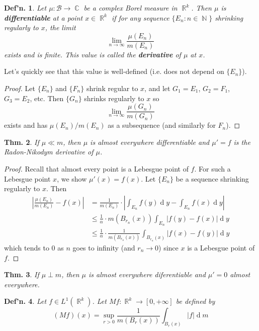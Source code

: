 \documentclass[12pt, a4paper]{book}
\DeclareMathOperator{\N}{\mathbb{N}}
\DeclareMathOperator{\R}{\mathbb{R}}
\DeclareMathOperator{\C}{\mathbb{C}}
\renewcommand{\d}[1]{\ensuremath{\operatorname{d}\!{#1}}} %
\newtheorem{theorem}{Thm.}[section]
\newtheorem{definition}[theorem]{Def'n.}
\theoremstyle{nonumberplain}
\newtheorem{proof}{Proof}
\begin{document}
\begin{definition}
    Let $\mu:\mathcal{B}\to\C$ be a complex Borel measure in $\R^k$.
    Then $\mu$ is \textbf{differentiable} at a point $x\in\R^k$ if for any sequence $\{E_n:n\in\N\}$ shrinking regularly to $x$, the limit
    \[\lim_{n\to\infty}\frac{\mu(E_n)}{m(E_n)}\]
    exists and is finite.
    This value is called the \textbf{derivative} of $\mu$ at $x$.
\end{definition}
Let's quickly see that this value is well-defined (i.e. does not depend on $\{E_n\}$).
\begin{proof}
    Let $\{E_n\}$ and $\{F_n\}$ shrink regular to $x$, and let $G_1=E_1$, $G_2=F_1$, $G_3=E_2$, etc.
    Then $\{G_n\}$ shrinks regularly to $x$ so
    \[\lim_{n\to\infty}\frac{\mu(G_n)}{m(G_n)}\]
    exists and has $\mu(E_n)/m(E_n)$ as a subsequence (and similarly for $F_n$).
\end{proof}
\begin{theorem}
    If $\mu\ll m$, then $\mu$ is almost everywhere differentiable and $\mu'=f$ is the Radon-Nikodym derivative of $\mu$.
\end{theorem}
\begin{proof}
    Recall that almost every point is a Lebesgue point of $f$.
    For such a Lebesgue point $x$, we show $\mu'(x)=f(x)$.
    Let $\{E_n\}$ be a sequence shrinking regularly to $x$.
    Then
    \begin{align*}
        \left\lvert\frac{\mu(E_n)}{m(E_n)}-f(x)\right\rvert &= \frac{1}{m(E_n)}\cdot\left\lvert\int_{E_n}f(y)\d{y}-\int_{E_n}f(x)\d{y}\right\rvert\\
                                                            &\leq \frac{1}{\alpha}\cdot m(B_{r_n}(x))\int_{E_n}|f(y)-f(x)|\d{y}\\
                                                            &\leq\frac{1}{\alpha}\cdot\frac{1}{m(B_{r_n}(x))}\int_{B_{r_n}(x)}|f(x)-f(y)|\d{y}
    \end{align*}
    which tends to $0$ as $n$ goes to infinity (and $r_n\to 0$) since $x$ is a Lebesgue point of $f$.
\end{proof}
\begin{theorem}
    If $\mu\perp m$, then $\mu$ is almost everywhere diferentiable and $\mu'=0$ almost everywhere.
\end{theorem}
\begin{definition}
    Let $f\in L^1(\R^k)$.
    Let $Mf:\R^k\to[0,+\infty]$ be defined by
    \[(Mf)(x)=\sup_{r>0}\frac{1}{m(B_r(x))}\int_{B_r(x)}|f|\d{m}\]
\end{definition}
\end{document}
